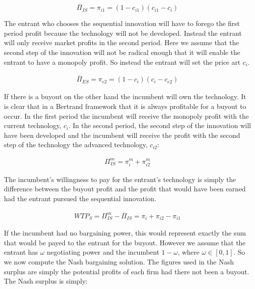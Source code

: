 \documentclass[11pt]{article}
\begin{document}
\begin{equation*}
\overline{\Pi}_{IS} = \pi_{i1}=(1-c_{i1})(c_{i1}-c_i) 
\end{equation*}

The entrant who chooses the sequential innovation will have to forego the first period profit because the technology will not be developed. Instead the entrant will only receive market profits in the second period. Here we assume that the second step of the innovation will not be radical enough that it will enable the entrant to have a monopoly profit. So instead the entrant will set the price art $c_i$.  

\begin{align*} 
\overline{\Pi}_{ES} =  
 \pi_{e2}=(1-c_{i})(c_i-c_{e2}) 
\end{align*}

If there is a buyout on the other hand the incumbent will own the technology. It is clear that in a Bertrand framework that it is always profitable for a buyout to occur. In the first period the incumbent will receive the monopoly profit with the current technology, $c_i$. In the second period, the second step of the innovation will have been developed and the incumbent will receive the profit with the second step of the technology the advanced technology, $c_{i2}$:

\begin{align*}
\Pi_{IS}^m = \pi_{i}^m +  \pi_{i2}^m 
\end{align*}

The incumbent's willingness to pay for the entrant's technology is simply the difference between the buyout profit and the profit that would have been earned had the entrant pursued the sequential innovation. 

\begin{align*}
WTP_S =\Pi_{IS}^m-\overline{\Pi}_{IS} = \pi_{i} +  \pi_{i2} - \pi_{i1} 
\end{align*}

If the incumbent had no bargaining power, this would represent exactly the sum that would be payed to the entrant for the buyout. However we assume that the entrant has $\omega$ negotiating power and the incumbent $1-\omega$, where $\omega \in [0,1]$. So we now compute the Nash bargaining solution. The figures used in the Nash surplus are simply the potential profits of each firm had there not been a buyout. The Nash surplus is simply: 
\end{document}
